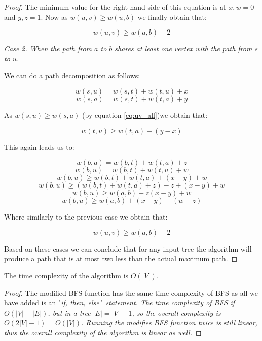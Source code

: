 \begin{proof}
The minimum value for the right hand side of this equation is at $x, w = 0$ and $y, z = 1$. Now as $w(u, v) \ge w(u, b)$ we finally obtain that:

$$ w(u, v) \ge w(a, b) - 2 $$


{\em Case 2. When the path from $a$ to $b$ shares at least one vertex with the path from $s$ to $u$.}


We can do a path decomposition as follows:

$$ w(s, u) = w(s, t) + w(t, u) + x $$
$$ w(s, a) = w(s, t) + w(t, a) + y $$

As $w(s, u) \ge w(s, a)$ (by equation \ref{eq:uv_all})we obtain that:

$$ w(t, u) \ge w(t, a) + (y - x) $$

This again leads us to:

$$ w(b, a) = w(b, t) + w(t, a) + z  $$
$$ w(b, u) = w(b, t) + w(t, u) + w  $$
$$ w(b, u) \ge w(b, t) + w(t, a) + (x - y) + w $$
$$ w(b, u) \ge (w(b, t) + w(t, a) + z) - z + (x - y) + w $$
$$ w(b, u) \ge w(a, b) - z (x - y) + w $$
$$ w(b, u) \ge w(a, b) + (x - y) + (w - z) $$

Where similarly to the previous case we obtain that:

$$ w(u, v) \ge w(a, b) - 2 $$


Based on these cases we can conclude that for any input tree the algorithm will produce a path that is at most two less than the actual maximum path.




\end{proof}

\begin{lem} The time complexity of the algorithm is $O(|V|)$. \end{lem}

\begin{proof}
    The modified BFS function has the same time complexity of BFS as all we have added is an "\em if, then, else\em"~statement. The time complexity of BFS if $O(|V| + |E|)$, but in a tree $|E| = |V| - 1$, so the overall complexity is $O(2|V| - 1) = O(|V|)$. 
    Running the modifies BFS function twice is still linear, thus the overall complexity of the algorithm is linear as well.
\end{proof}

